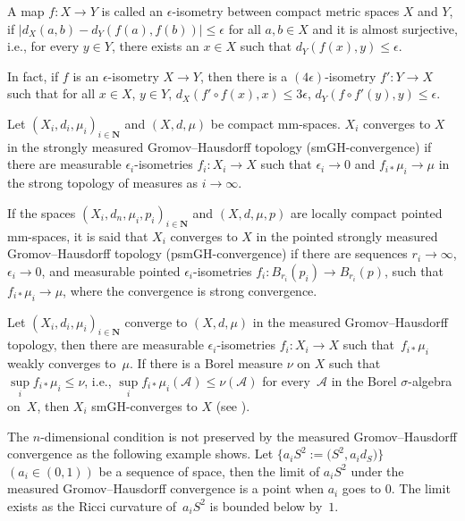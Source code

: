 \documentclass[pdftex]{sigma}
\begin{document}
 A map $f\colon X\rightarrow Y$ is called an $\epsilon$-isometry between compact metric spaces $X$ and $Y$, if $|d_{X}(a, b)-d_{Y}(f(a), f(b))|\leq\epsilon$ for all $a,b \in X$ and it is almost surjective, i.e., for every $y\in Y$, there exists an $x\in X$ such that $d_Y(f(x), y)\leq \epsilon$.

 In fact, if $f$ is an $\epsilon$-isometry $X\rightarrow Y$, then there is a $(4\epsilon)$-isometry $f'\colon Y\rightarrow X$ such that for all $x\in X$, $y\in Y$, $d_X(f'\circ f(x), x)\leq 3\epsilon$, $d_Y(f\circ f'(y), y)\leq \epsilon$.

 \begin{Definition}
 Let $(X_i, d_i, \mu_i)_{i\in\mathbf{N}}$ and $(X, d, \mu)$ be compact mm-spaces. $X_i$ converges to $X$ in the strongly measured Gromov--Hausdorff topology (smGH-convergence) if there are measurable $\epsilon_i$-isometries $f_i\colon X_i\rightarrow X$ such that $ \epsilon_i \rightarrow 0$ and $f_{i*}\mu_i\rightarrow \mu$ in the strong topology of measures as $i\rightarrow \infty$.

 If the spaces $(X_i,d_n,\mu_i,p_i)_{i\in\mathbf{N}}$ and $(X,d,\mu,p)$ are locally compact pointed mm-spaces, it is said that $X_i$ converges to $X$ in the pointed strongly measured Gromov--Hausdorff topo\-lo\-gy (psmGH-convergence) if there are sequences $r_i\to \infty$, $\epsilon_i \to 0$, and measurable pointed $\epsilon_i$-isometries $f_i\colon B_{r_i}(p_i)\to B_{r_i}(p)$, such that $f_{i*}\mu_i \to \mu$, where the convergence is strong convergence.
 \end{Definition}

\begin{Remark}Let $(X_i, d_i, \mu_i)_{i\in\mathbf{N}}$ converge to $(X, d, \mu)$ in the measured Gromov--Hausdorff topo\-lo\-gy, then there are measurable $\epsilon_i$-isometries $f_i\colon X_i\rightarrow X$ such that~$f_{i*}\mu_i$ weakly converges to~$\mu$. If there is a Borel measure $\nu$ on $X$ such that $\sup\limits_{i}f_{i*}\mu_i\leq \nu$, i.e., $\sup \limits_{i}f_{i*}\mu_i (\mathcal{A})\leq \nu(\mathcal{A})$ for every~$\mathcal{A}$ in the Borel $\sigma$-algebra on~$X$, then $X_i$ smGH-converges to $X$ (see \cite[Lemma~4.1]{MR1453465}).
\end{Remark}

\begin{Remark}The $n$-dimensional condition is not preserved by the measured Gromov--Hausdorff convergence as the following example shows. Let $\big\{a_i S^2:= \big(S^2, a_i d_S \big)\big\}$ $(a_i \in (0,1))$ be a sequence of space, then the limit of $a_i S^2$ under the measured Gromov--Hausdorff convergence is a point when $a_i$ goes to $0$. The limit exists as the Ricci curvature of~$a_i S^2$ is bounded below by~$1$.
\end{Remark}
\end{document}
